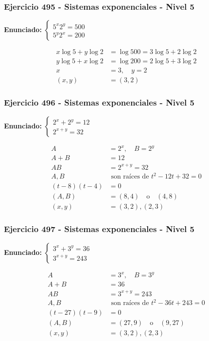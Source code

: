 \documentclass[12pt,a4paper]{article}
\begin{document}
\subsubsection*{Ejercicio 495 - Sistemas exponenciales - Nivel 5}
\textbf{Enunciado:} \(\begin{cases}5^x2^y=500\\ 5^y2^x=200\end{cases}\)

\[
\begin{aligned}
x\log5+y\log2&=\log500=3\log5+2\log2\\
y\log5+x\log2&=\log200=2\log5+3\log2\\
x&=3,
\quad y=2\\
(x,y)&=\boxed{(3,2)}
\end{aligned}
\]


\subsubsection*{Ejercicio 496 - Sistemas exponenciales - Nivel 5}
\textbf{Enunciado:} \(\begin{cases}2^x+2^y=12\\ 2^{x+y}=32\end{cases}\)

\[
\begin{aligned}
A&=2^x,
\quad B=2^y\\
A+B&=12\\
AB&=2^{x+y}=32\\
A,B&\text{ son raíces de } t^2-12t+32=0\\
(t-8)(t-4)&=0\\
(A,B)&=(8,4)\quad \text{o}\quad (4,8)\\
(x,y)&=\boxed{(3,2),(2,3)}
\end{aligned}
\]


\subsubsection*{Ejercicio 497 - Sistemas exponenciales - Nivel 5}
\textbf{Enunciado:} \(\begin{cases}3^x+3^y=36\\ 3^{x+y}=243\end{cases}\)

\[
\begin{aligned}
A&=3^x,
\quad B=3^y\\
A+B&=36\\
AB&=3^{x+y}=243\\
A,B&\text{ son raíces de } t^2-36t+243=0\\
(t-27)(t-9)&=0\\
(A,B)&=(27,9)\quad \text{o}\quad (9,27)\\
(x,y)&=\boxed{(3,2),(2,3)}
\end{aligned}
\]
\end{document}
